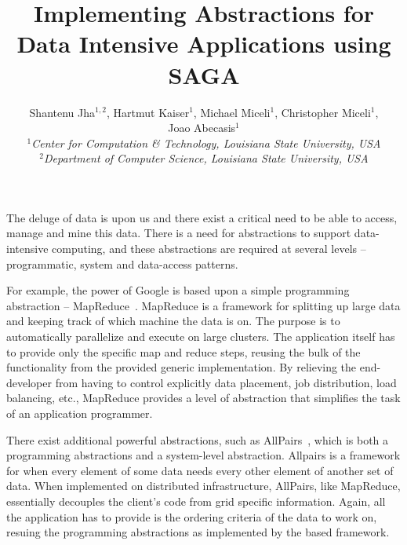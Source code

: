 \documentclass[a4paper,10pt]{article}
\begin{document}
\title{\large Implementing Abstractions for Data Intensive Applications using SAGA}

\author{Shantenu Jha$^{1,2}$, Hartmut Kaiser$^{1}$, Michael Miceli$^{1}$, Christopher Miceli$^{1}$, \\ Joao Abecasis$^{1}$\\
  \small{\emph{$^{1}$Center for Computation \& Technology, Louisiana State University, USA}}\\
  \small{\emph{$^{2}$Department of Computer Science, Louisiana State
      University, USA}}}

\maketitle


The deluge of data is upon us and there exist a critical need to be
able to access, manage and mine this data. There is a need for
abstractions to support data-intensive computing, and these
abstractions are required at several levels -- programmatic, system
and data-access patterns.

For example, the power of Google is based upon a simple programming
abstraction -- MapReduce~\cite{mapreduce}.  MapReduce is a framework
for splitting up large data and keeping track of which machine the
data is on. The purpose is to automatically parallelize and execute on
large clusters.  The application itself has to provide only the
specific map and reduce steps, reusing the bulk of the functionality
from the provided generic implementation.  By relieving the
end-developer from having to control explicitly data placement, job
distribution, load balancing, etc., MapReduce provides a level of
abstraction that simplifies the task of an application programmer.

There exist additional powerful abstractions, such as
AllPairs~\cite{allpairs}, which is both a programming abstractions and
a system-level abstraction.  Allpairs is a framework for when every
element of some data needs every other element of another set of data.
When implemented on distributed infrastructure, AllPairs, like
MapReduce, essentially decouples the client's code from grid specific
information.  Again, all the application has to provide is the
ordering criteria of the data to work on, resuing the programming
abstractions as implemented by the based framework.

\end{document}
